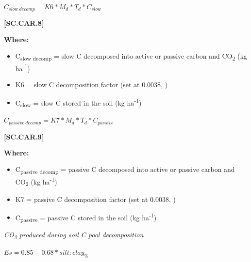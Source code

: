     \begin{center}
\(C_{slow\ decomp}=K6 * M_d * T_d * C_{slow}\)

    \end{center}
        \vspace{0.5cm} 
    
            {\raggedleft \textbf{[SC.CAR.8]}\par}
            \vspace{0.5cm}

        \textbf{Where:}
            
        \begin{itemize}
            \item C\textsubscript{slow decomp} = slow C decomposed into active or passive carbon and CO\textsubscript{2} (kg ha\textsuperscript{-1})
            \item K6 = slow C decomposition factor (set at 0.0038, \cite{parton1987analysis})
            \item C\textsubscript{slow} = slow C stored in the soil (kg ha\textsuperscript{-1})
        \end{itemize}
        \vspace{0.5cm}

    \begin{center}
\(C_{passive\ decomp}=K7 * M_d * T_d * C_{passive}\)

    \end{center}
        \vspace{0.5cm} 
    
            {\raggedleft \textbf{[SC.CAR.9]}\par}
            \vspace{0.5cm}

        \textbf{Where:}

        \begin{itemize}
            \item C\textsubscript{passive decomp} = passive C decomposed into active or passive carbon and CO\textsubscript{2} (kg ha\textsuperscript{-1})
            \item K7 = passive C decomposition factor (set at 0.0038, \cite{parton1987analysis})
            \item C\textsubscript{passive} = passive C stored in the soil (kg ha\textsuperscript{-1})
        \end{itemize}
        \vspace{0.5cm}

\textit{CO\textsubscript{2} produced during soil C pool decomposition}
    \vspace{0.2cm}
    \begin{center}
\(Es=0.85-0.68 * silt:clay_\%	\)

    \end{center}
        \vspace{0.5cm} 
    

